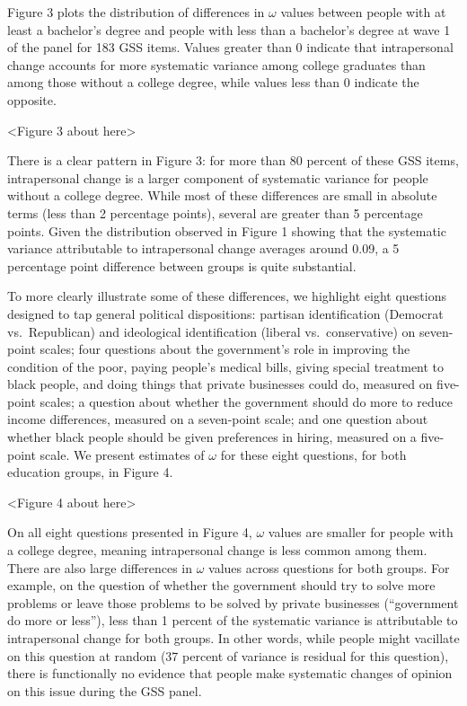 \documentclass[
  12pt,
]{article}
\begin{document}
Figure 3 plots the distribution of differences in \(\omega\) values
between people with at least a bachelor's degree and people with less
than a bachelor's degree at wave 1 of the panel for 183 GSS items.
Values greater than 0 indicate that intrapersonal change accounts for
more systematic variance among college graduates than among those
without a college degree, while values less than 0 indicate the
opposite.

\begin{center}
<Figure 3 about here>
\end{center}

There is a clear pattern in Figure 3: for more than 80 percent of these
GSS items, intrapersonal change is a larger component of systematic
variance for people without a college degree. While most of these
differences are small in absolute terms (less than 2 percentage points),
several are greater than 5 percentage points. Given the distribution
observed in Figure 1 showing that the systematic variance attributable
to intrapersonal change averages around 0.09, a 5 percentage point
difference between groups is quite substantial.

To more clearly illustrate some of these differences, we highlight eight
questions designed to tap general political dispositions: partisan
identification (Democrat vs.~Republican) and ideological identification
(liberal vs.~conservative) on seven-point scales; four questions about
the government's role in improving the condition of the poor, paying
people's medical bills, giving special treatment to black people, and
doing things that private businesses could do, measured on five-point
scales; a question about whether the government should do more to reduce
income differences, measured on a seven-point scale; and one question
about whether black people should be given preferences in hiring,
measured on a five-point scale. We present estimates of \(\omega\) for
these eight questions, for both education groups, in Figure 4.

\begin{center}
<Figure 4 about here>
\end{center}

On all eight questions presented in Figure 4, \(\omega\) values are
smaller for people with a college degree, meaning intrapersonal change
is less common among them. There are also large differences in
\(\omega\) values across questions for both groups. For example, on the
question of whether the government should try to solve more problems or
leave those problems to be solved by private businesses (``government do
more or less''), less than 1 percent of the systematic variance is
attributable to intrapersonal change for both groups. In other words,
while people might vacillate on this question at random (37 percent of
variance is residual for this question), there is functionally no
evidence that people make systematic changes of opinion on this issue
during the GSS panel.
\end{document}
